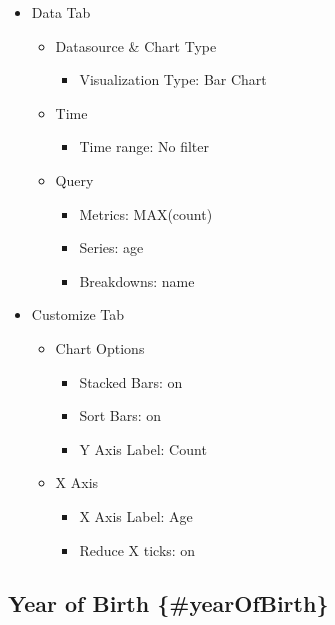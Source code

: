 \documentclass[
]{book}
\providecommand{\tightlist}{%
  \setlength{\itemsep}{0pt}\setlength{\parskip}{0pt}}
\begin{document}
\begin{itemize}
\tightlist
\item
  Data Tab

  \begin{itemize}
  \tightlist
  \item
    Datasource \& Chart Type

    \begin{itemize}
    \tightlist
    \item
      Visualization Type: Bar Chart
    \end{itemize}
  \item
    Time

    \begin{itemize}
    \tightlist
    \item
      Time range: No filter
    \end{itemize}
  \item
    Query

    \begin{itemize}
    \tightlist
    \item
      Metrics: MAX(count)
    \item
      Series: age
    \item
      Breakdowns: name
    \end{itemize}
  \end{itemize}
\item
  Customize Tab

  \begin{itemize}
  \tightlist
  \item
    Chart Options

    \begin{itemize}
    \tightlist
    \item
      Stacked Bars: on
    \item
      Sort Bars: on
    \item
      Y Axis Label: Count
    \end{itemize}
  \item
    X Axis

    \begin{itemize}
    \tightlist
    \item
      X Axis Label: Age
    \item
      Reduce X ticks: on
    \end{itemize}
  \end{itemize}
\end{itemize}

\hypertarget{year-of-birth-yearofbirth}{%
\subsection*{Year of Birth \{\#yearOfBirth\}}\label{year-of-birth-yearofbirth}}
\end{document}
